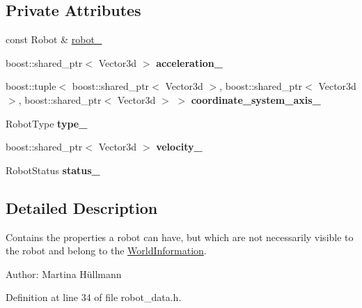 \subsection*{Private Attributes}
\begin{CompactItemize}
\item 
const Robot \& \hyperlink{class_robot_data_76bc912be93d4367f36234756b3bab7d}{robot\_\-}
\item 
\hypertarget{class_robot_data_da33b1d10cd1437104019459ca5cc214}{
boost::shared\_\-ptr$<$ Vector3d $>$ \textbf{acceleration\_\-}}
\label{class_robot_data_da33b1d10cd1437104019459ca5cc214}

\item 
\hypertarget{class_robot_data_5108482654c2bbfa3ff33e5be338ac2c}{
boost::tuple$<$ boost::shared\_\-ptr$<$ Vector3d $>$, boost::shared\_\-ptr$<$ Vector3d $>$, boost::shared\_\-ptr$<$ Vector3d $>$ $>$ \textbf{coordinate\_\-system\_\-axis\_\-}}
\label{class_robot_data_5108482654c2bbfa3ff33e5be338ac2c}

\item 
\hypertarget{class_robot_data_0ccbbf541e62a57ca12ffbb2239884c7}{
RobotType \textbf{type\_\-}}
\label{class_robot_data_0ccbbf541e62a57ca12ffbb2239884c7}

\item 
\hypertarget{class_robot_data_de8cc166cfa98dd9ef1ba1823111d82d}{
boost::shared\_\-ptr$<$ Vector3d $>$ \textbf{velocity\_\-}}
\label{class_robot_data_de8cc166cfa98dd9ef1ba1823111d82d}

\item 
\hypertarget{class_robot_data_8a991a0b98bdc099ab7e8c37394039a4}{
RobotStatus \textbf{status\_\-}}
\label{class_robot_data_8a991a0b98bdc099ab7e8c37394039a4}

\end{CompactItemize}


\subsection{Detailed Description}
Contains the properties a robot can have, but which are not necessarily visible to the robot and belong to the \hyperlink{class_world_information}{WorldInformation}. 

\begin{Desc}
\item[Author:]Martina Hüllmann \end{Desc}


Definition at line 34 of file robot\_\-data.h.

